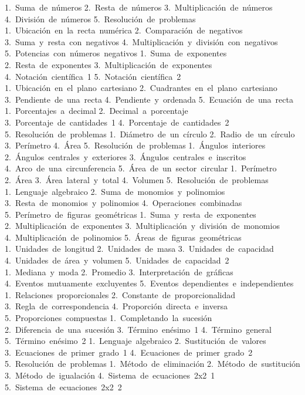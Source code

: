 1.~Suma~de~números
2.~Resta~de~números
3.~Multiplicación~de~números
4.~División~de~números
5.~Resolución~de~problemas
1.~Ubicación~en~la~recta~numérica
2.~Comparación~de~negativos
3.~Suma~y~resta~con~negativos
4.~Multiplicación~y~división~con~negativos
5.~Potencias~con~números~negativos
1.~Suma~de~exponentes
2.~Resta~de~exponentes
3.~Multiplicación~de~exponentes
4.~Notación~científica~1
5.~Notación~científica~2
1.~Ubicación~en~el~plano~cartesiano
2.~Cuadrantes~en~el~plano~cartesiano
3.~Pendiente~de~una~recta
4.~Pendiente~y~ordenada
5.~Ecuación~de~una~recta
1.~Porcentajes~a~decimal
2.~Decimal~a~porcentaje
3.~Porcentaje~de~cantidades~1
4.~Porcentaje~de~cantidades~2
5.~Resolución~de~problemas
1.~Diámetro~de~un~círculo
2.~Radio~de~un~círculo
3.~Perímetro
4.~Área
5.~Resolución~de~problemas
1.~Ángulos~interiores
2.~Ángulos~centrales~y~exteriores
3.~Ángulos~centrales~e~inscritos
4.~Arco~de~una~circunferencia
5.~Área~de~un~sector~circular
1.~Perímetro
2.~Área
3.~Área~lateral~y~total
4.~Volumen
5.~Resolución~de~problemas
1.~Lenguaje~algebraico
2.~Suma~de~monomios~y~polinomios
3.~Resta~de~monomios~y~polinomios
4.~Operaciones~combinadas
5.~Perímetro~de~figuras~geométricas
1.~Suma~y~resta~de~exponentes
2.~Multiplicación~de~exponentes
3.~Multiplicación~y~división~de~monomios
4.~Multiplicación~de~polinomios
5.~Áreas~de~figuras~geométricas
1.~Unidades~de~longitud
2.~Unidades~de~masa
3.~Unidades~de~capacidad
4.~Unidades~de~área~y~volumen
5.~Unidades~de~capacidad~2
1.~Mediana~y~moda
2.~Promedio
3.~Interpretación~de~gráficas
4.~Eventos~mutuamente~excluyentes
5.~Eventos~dependientes~e~independientes
1.~Relaciones~proporcionales
2.~Constante~de~proporcionalidad
3.~Regla~de~correspondencia
4.~Proporción~directa~e~inversa
5.~Proporciones~compuestas
1.~Completando~la~sucesión
2.~Diferencia~de~una~sucesión
3.~Término~enésimo~1
4.~Término~general
5.~Término~enésimo~2
1.~Lenguaje~algebraico
2.~Sustitución~de~valores
3.~Ecuaciones~de~primer~grado~1
4.~Ecuaciones~de~primer~grado~2
5.~Resolución~de~problemas
1.~Método~de~eliminación
2.~Método~de~sustitución
3.~Método~de~igualación
4.~Sistema~de~ecuaciones~2x2~1
5.~Sistema~de~ecuaciones~2x2~2